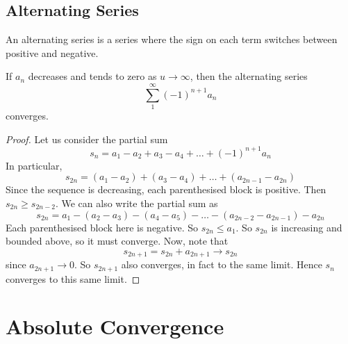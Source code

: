 \documentclass{article}
\begin{document}
\subsection{Alternating Series}
An alternating series is a series where the sign on each term switches between positive and negative.
\begin{theorem}
    If $a_n$ decreases and tends to zero as $u \to \infty$, then the alternating series
    \[ \sum_1^\infty (-1)^{n+1} a_n \]
    converges.
\end{theorem}
\begin{proof}
    Let us consider the partial sum
    \[ s_n = a_1 - a_2 + a_3 - a_4 + \dots + (-1)^{n+1}a_n \]
    In particular,
    \[ s_{2n} = (a_1 - a_2) + (a_3 - a_4) + \dots + (a_{2n-1} - a_{2n}) \]
    Since the sequence is decreasing, each parenthesised block is positive. Then $s_{2n} \geq s_{2n-2}$. We can also write the partial sum as
    \[ s_{2n} = a_1 - (a_2 - a_3) - (a_4 - a_5) - \dots - (a_{2n-2} - a_{2n-1}) - a_{2n} \]
    Each parenthesised block here is negative. So $s_{2n} \leq a_1$. So $s_{2n}$ is increasing and bounded above, so it must converge. Now, note that
    \[ s_{2n+1} = s_{2n} + a_{2n+1} \to s_{2n} \]
    since $a_{2n+1} \to 0$. So $s_{2n+1}$ also converges, in fact to the same limit. Hence $s_n$ converges to this same limit.
\end{proof}

\section{Absolute Convergence}
\end{document}
